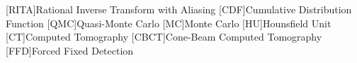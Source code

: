 [RITA]{Rational Inverse Transform with Aliasing}
[CDF]{Cumulative Distribution Function}
[QMC]{Quasi-Monte Carlo}
[MC]{Monte Carlo}
[HU]{Hounsfield Unit}
[CT]{Computed Tomography}
[CBCT]{Cone-Beam Computed Tomography}
[FFD]{Forced Fixed Detection}